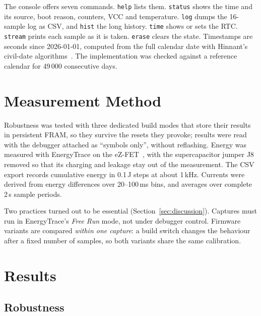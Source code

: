\documentclass[conference]{IEEEtran}
\newcommand{\code}[1]{\texttt{#1}}
\begin{document}
The console offers seven commands. \code{help} lists them. \code{status} shows the time and its source, boot reason, counters, VCC and temperature. \code{log} dumps the 16-sample log as CSV, and \code{hist} the long history. \code{time} shows or sets the RTC. \code{stream} prints each sample as it is taken. \code{erase} clears the state. Timestamps are seconds since 2026-01-01, computed from the full calendar date with Hinnant's civil-date algorithms~\cite{hinnant_date}. The implementation was checked against a reference calendar for 49\,000 consecutive days.

\section{Measurement Method}
\label{sec:method}

Robustness was tested with three dedicated build modes that store their results in persistent FRAM, so they survive the resets they provoke; results were read with the debugger attached as ``symbols only'', without reflashing. Energy was measured with EnergyTrace on the eZ-FET~\cite{ti_slaa603}, with the supercapacitor jumper J8 removed so that its charging and leakage stay out of the measurement. The CSV export records cumulative energy in 0.1\,\textmu J steps at about 1\,kHz. Currents were derived from energy differences over 20--100\,ms bins, and averages over complete 2\,s sample periods.

Two practices turned out to be essential (Section~\ref{sec:discussion}). Captures must run in EnergyTrace's \emph{Free Run} mode, not under debugger control. Firmware variants are compared \emph{within one capture}: a build switch changes the behaviour after a fixed number of samples, so both variants share the same calibration.

\section{Results}
\label{sec:results}

\subsection{Robustness}
\end{document}
